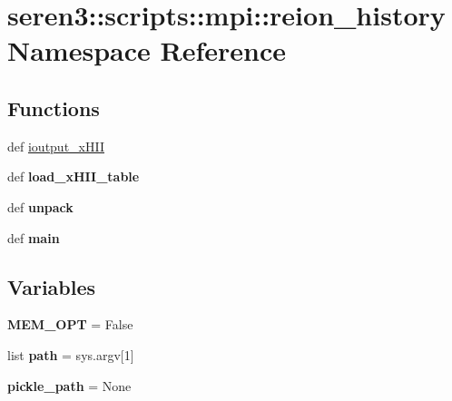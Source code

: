 \hypertarget{namespaceseren3_1_1scripts_1_1mpi_1_1reion__history}{
\section{seren3::scripts::mpi::reion\_\-history Namespace Reference}
\label{namespaceseren3_1_1scripts_1_1mpi_1_1reion__history}
}
\subsection*{Functions}
\begin{DoxyCompactItemize}
\item 
def \hyperlink{namespaceseren3_1_1scripts_1_1mpi_1_1reion__history_a681fd00960f746e906387cdb244f30ac}{ioutput\_\-xHII}
\item 
\hypertarget{namespaceseren3_1_1scripts_1_1mpi_1_1reion__history_a8b1cfb32595c6327717ac5341cdc27ef}{
def {\bfseries load\_\-xHII\_\-table}}
\label{namespaceseren3_1_1scripts_1_1mpi_1_1reion__history_a8b1cfb32595c6327717ac5341cdc27ef}

\item 
\hypertarget{namespaceseren3_1_1scripts_1_1mpi_1_1reion__history_a3ef72a958498ee57ba63596dd45b91c9}{
def {\bfseries unpack}}
\label{namespaceseren3_1_1scripts_1_1mpi_1_1reion__history_a3ef72a958498ee57ba63596dd45b91c9}

\item 
\hypertarget{namespaceseren3_1_1scripts_1_1mpi_1_1reion__history_a907827032532c66a906c6df68d258dad}{
def {\bfseries main}}
\label{namespaceseren3_1_1scripts_1_1mpi_1_1reion__history_a907827032532c66a906c6df68d258dad}

\end{DoxyCompactItemize}
\subsection*{Variables}
\begin{DoxyCompactItemize}
\item 
\hypertarget{namespaceseren3_1_1scripts_1_1mpi_1_1reion__history_ae389db0ca8bc22dcad0295f4329516ef}{
{\bfseries MEM\_\-OPT} = False}
\label{namespaceseren3_1_1scripts_1_1mpi_1_1reion__history_ae389db0ca8bc22dcad0295f4329516ef}

\item 
\hypertarget{namespaceseren3_1_1scripts_1_1mpi_1_1reion__history_a0470649de5971ae3e670760cf1a3105e}{
list {\bfseries path} = sys.argv\mbox{[}1\mbox{]}}
\label{namespaceseren3_1_1scripts_1_1mpi_1_1reion__history_a0470649de5971ae3e670760cf1a3105e}

\item 
\hypertarget{namespaceseren3_1_1scripts_1_1mpi_1_1reion__history_a7d63611b61cab2ae8c7d20aa2a555932}{
{\bfseries pickle\_\-path} = None}
\label{namespaceseren3_1_1scripts_1_1mpi_1_1reion__history_a7d63611b61cab2ae8c7d20aa2a555932}

\end{DoxyCompactItemize}


